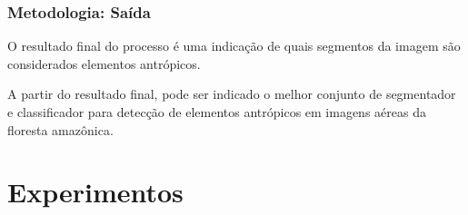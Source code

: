 \documentclass[t]{beamer}
\begin{document}
\begin{frame}[c]
	\frametitle{Metodologia: Saída}

	O resultado final do processo é uma indicação de quais segmentos da imagem são considerados elementos antrópicos.

	\vspace{0.5cm}	

	A partir do resultado final, pode ser indicado o melhor conjunto de segmentador e classificador para detecção de elementos antrópicos em imagens aéreas da floresta amazônica.

\end{frame}


\section{Experimentos}
\end{document}
